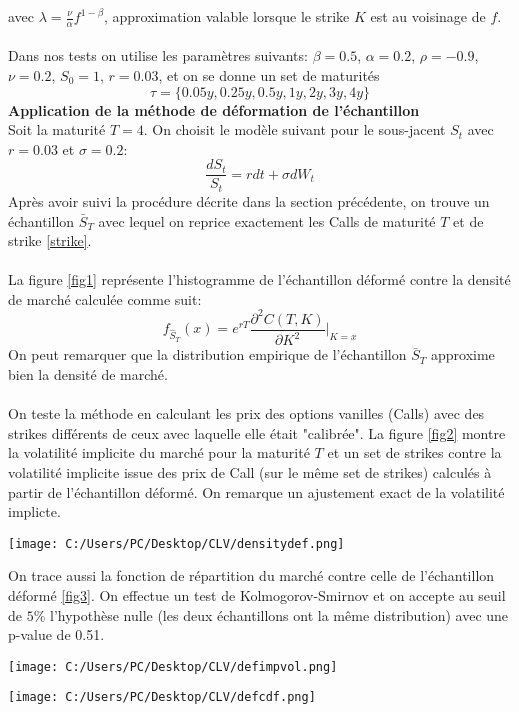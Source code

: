 \documentclass[a4paper,12pt]{report}
\numberwithin{equation}{section}
\theoremstyle{definition}
\numberwithin{equation}{section}
\begin{document}
avec $\lambda=\frac{\nu}{\alpha}f^{1-\beta}$, approximation valable lorsque le strike $K$ est au voisinage de $f$.
\\\\
Dans nos tests on utilise les paramètres suivants: $\beta=0.5$, $\alpha=0.2$, $\rho=-0.9$, $\nu=0.2$, $S_{0}=1$, $r=0.03$, et on se donne un set de maturités 
\begin{equation}
\label{setMat}
\tau=\{0.05y,0.25y,0.5y,1y,2y,3y,4y\}
\end{equation}
\textbf{Application de la méthode de déformation de l'échantillon}\\
Soit la maturité $T=4$. On choisit le modèle suivant pour le sous-jacent $S_{t}$ avec $r=0.03$ et $\sigma=0.2$:
$$ \frac{dS_{t}}{S_{t}}=rdt+\sigma dW_{t}$$
Après avoir suivi la procédure décrite dans la section précédente, on trouve un échantillon $\bar S_T$ avec lequel on reprice exactement les Calls de maturité $T$ et de strike \ref{strike}.\\\\
La figure \ref{fig1} représente l'histogramme de l'échantillon déformé contre la densité de marché calculée comme suit:
$$f_{\hat S_T}(x) = e^{rT}\frac{\partial^2 C(T,K)}{\partial K^2}\bigg|_{K=x}$$ 
On peut remarquer que la distribution empirique de l'échantillon $\bar{S}_T$ approxime bien la densité de marché. \\\\
On teste la méthode en calculant les prix des options vanilles (Calls) avec des strikes différents de ceux avec laquelle elle était "calibrée". La figure \ref{fig2} montre la volatilité implicite du marché pour la maturité $T$ et un set de strikes contre la volatilité implicite issue des prix de Call (sur le même set de strikes) calculés à partir de l'échantillon déformé. On remarque un ajustement exact de la volatilité implicte. 
\begin{center}
\label{fig1}
\texttt{[image: C:/Users/PC/Desktop/CLV/densitydef.png]}
\end{center}
On trace aussi la fonction de répartition du marché contre celle de l'échantillon déformé \ref{fig3}. On effectue un test de Kolmogorov-Smirnov et on accepte au seuil de $5\%$ l'hypothèse nulle (les deux échantillons ont la même distribution) avec une p-value de 0.51. 
\begin{center}
\label{fig2}
\texttt{[image: C:/Users/PC/Desktop/CLV/defimpvol.png]}
\end{center}
\begin{center}
\label{fig3}
\texttt{[image: C:/Users/PC/Desktop/CLV/defcdf.png]}
\end{center}
\end{document}
